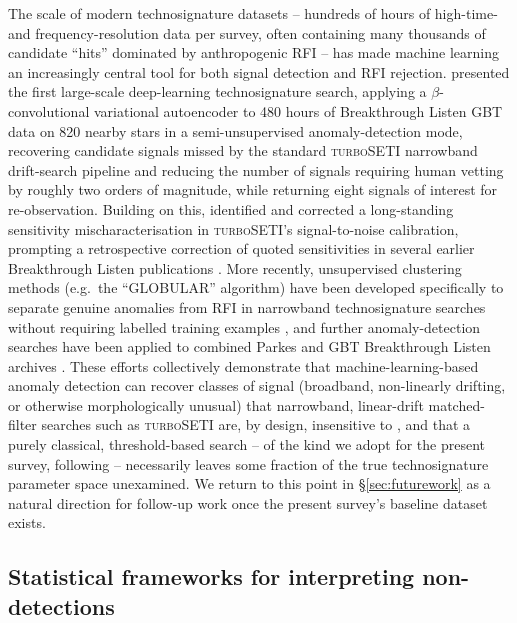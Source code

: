 \documentclass{openjournal}
\begin{document}
The scale of modern technosignature datasets -- hundreds of hours of
high-time- and frequency-resolution data per survey, often containing many
thousands of candidate ``hits'' dominated by anthropogenic RFI -- has made
machine learning an increasingly central tool for both signal detection and RFI
rejection. \citet{Ma2023} presented the first large-scale deep-learning
technosignature search, applying a $\beta$-convolutional variational autoencoder
to 480 hours of Breakthrough Listen GBT data on 820 nearby stars in a
semi-unsupervised anomaly-detection mode, recovering candidate signals missed by
the standard \textsc{turboSETI} narrowband drift-search pipeline
\citep{Enriquez2019} and reducing the number of signals requiring human vetting by
roughly two orders of magnitude, while returning eight signals of interest for
re-observation. Building on this, \citet{Choza2024} identified and corrected a
long-standing sensitivity mischaracterisation in \textsc{turboSETI}'s
signal-to-noise calibration, prompting a retrospective correction of quoted
sensitivities in several earlier Breakthrough Listen publications
\citep{GBTarchiveML2025}. More recently, unsupervised clustering methods (e.g.\
the ``GLOBULAR'' algorithm) have been developed specifically to separate genuine
anomalies from RFI in narrowband technosignature searches without requiring
labelled training examples \citep{GLOBULAR2025}, and further anomaly-detection
searches have been applied to combined Parkes and GBT Breakthrough Listen archives
\citep{AnomalyParkesGBT2025}. These efforts collectively demonstrate that
machine-learning-based anomaly detection can recover classes of signal
(broadband, non-linearly drifting, or otherwise morphologically unusual) that
narrowband, linear-drift matched-filter searches such as \textsc{turboSETI} are,
by design, insensitive to \citep{BRaTs2026}, and that a purely classical,
threshold-based search -- of the kind we adopt for the present survey, following
\citet{Mason2024} -- necessarily leaves some fraction of the true technosignature
parameter space unexamined. We return to this point in \S\ref{sec:futurework} as
a natural direction for follow-up work once the present survey's baseline dataset
exists.

\subsection{Statistical frameworks for interpreting non-detections}
\label{sec:stats}
\end{document}
